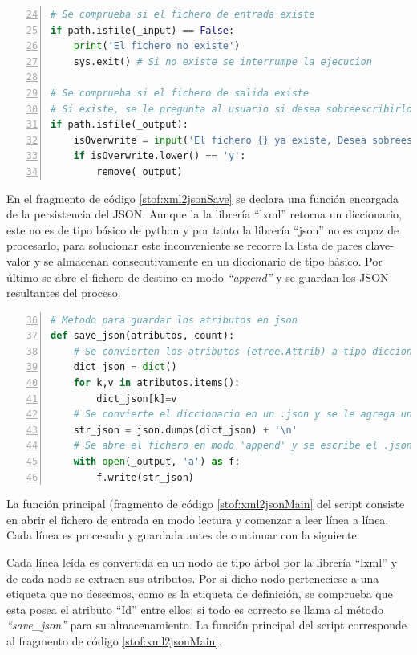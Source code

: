 \begin{lstlisting}[label=stof:xml2jsonCheck,language=Python,frame=single,caption=Fragmento de código del script ``xml2json.py'' de comprobación del estado de los ficheros \textit{in/out}., firstnumber=24,numbers=left]
# Se comprueba si el fichero de entrada existe
if path.isfile(_input) == False:
	print('El fichero no existe')
	sys.exit() # Si no existe se interrumpe la ejecucion

# Se comprueba si el fichero de salida existe
# Si existe, se le pregunta al usuario si desea sobreescribirlo
if path.isfile(_output):
	isOverwrite = input('El fichero {} ya existe, Desea sobreescribirlo?[Y/n]: '.format(_output))
	if isOverwrite.lower() == 'y':
		remove(_output)	
\end{lstlisting}

En el fragmento de código \ref{stof:xml2jsonSave} se declara una función encargada de la persistencia del \gls{JSON}. Aunque la la librería ``lxml'' retorna un diccionario, este no es de tipo básico de python y por tanto la librería ``json'' no es capaz de procesarlo, para solucionar este inconveniente se recorre la lista de pares clave-valor y se almacenan consecutivamente en un diccionario de tipo básico. Por último se abre el fichero de destino en modo \textit{``append''} y se guardan los \gls{JSON} resultantes del proceso.

\begin{lstlisting}[label=stof:xml2jsonSave,language=Python,frame=single,caption=Fragmento de código del script ``xml2json.py'' encargado de la persistencia de resultados., firstnumber=36,numbers=left]
# Metodo para guardar los atributos en json
def save_json(atributos, count):
	# Se convierten los atributos (etree.Attrib) a tipo diccionario
	dict_json = dict()
	for k,v in atributos.items():
		dict_json[k]=v
	# Se convierte el diccionario en un .json y se le agrega un salto de linea final
	str_json = json.dumps(dict_json) + '\n'
	# Se abre el fichero en modo 'append' y se escribe el .json
	with open(_output, 'a') as f:
		f.write(str_json)
\end{lstlisting}

La función principal (fragmento de código \ref{stof:xml2jsonMain} del script consiste en abrir el fichero de entrada en modo lectura y comenzar a leer línea a línea. Cada línea es procesada y guardada antes de continuar con la siguiente.

Cada línea leída es convertida en un nodo de tipo árbol por la librería ``lxml'' y de cada nodo se extraen sus atributos. Por si dicho nodo perteneciese a una etiqueta que no deseemos, como es la etiqueta de definición, se comprueba que esta posea el atributo ``Id'' entre ellos; si todo es correcto se llama al método \textit{``save\_json''} para su almacenamiento. La función principal del script corresponde al fragmento de código \ref{stof:xml2jsonMain}.


